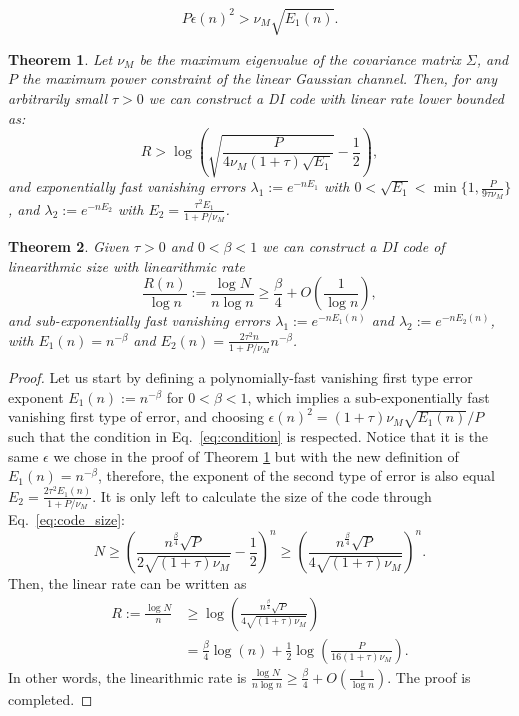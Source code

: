 \documentclass[10pt,a4paper]{amsart}
\newtheorem{theorem}{Theorem}
\begin{document}
\begin{equation}\label{eq:condition}
P\epsilon(n)^2>\nu_M \sqrt{E_1(n)}.
\end{equation}

\begin{theorem}\label{thm:ach_linear}
Let $\nu_M$ be the maximum eigenvalue of the covariance matrix $\Sigma$, and $P$ the maximum power constraint of the linear Gaussian channel. Then, for any arbitrarily small $\tau>0$ we can construct a DI code with linear rate lower bounded as:
\[
R>\log\left(\sqrt{\frac{P}{4\nu_M(1+\tau) \sqrt{E_1}}}-\frac12\right),
\]
and exponentially fast vanishing errors $\lambda_1:=e^{-nE_1}$ with $0<\sqrt{E_1}< \min\{1,\frac{P}{9\tau\nu_M}\}$, and $\lambda_2:=e^{-nE_2}$ with $E_2=\frac{\tau^2E_1}{1+P/\nu_M}$.
\end{theorem}

\begin{theorem}\label{thm:achievability_linearithmic}
Given $\tau>0$ and $0<\beta<1$ we can construct a DI code of linearithmic size with linearithmic rate
\[
\frac{R(n)}{\log n}:=\frac{\log N}{n\log n}\geq\frac{\beta}{4}+O\left(\frac{1}{\log n}\right),
\]
and sub-exponentially fast vanishing errors $\lambda_1:=e^{-nE_1(n)}$ and $\lambda_2:=e^{-nE_2(n)}$, with $E_1(n)=n^{-\beta}$ and $E_2(n)=\frac{2\tau^2n}{1+P/\nu_M}n^{-\beta}$.
\end{theorem}

\begin{proof}
Let us start by defining a polynomially-fast vanishing first type error exponent $E_1(n):=n^{-\beta}$ for $0<\beta<1$, which implies a sub-exponentially fast vanishing first type of error, and choosing $\epsilon(n)^2=(1+\tau)\nu_M\sqrt{E_1(n)}/P$ such that the condition in Eq.~\eqref{eq:condition} is respected. Notice that it is the same $\epsilon$ we chose in the proof of Theorem \ref{thm:ach_linear} but with the new definition of $E_1(n)=n^{-\beta}$, therefore, the exponent of the second type of error is also equal $E_2=\frac{2\tau^2E_1(n)}{1+P/\nu_M}$. It is only left to calculate the size of the code through Eq.~\eqref{eq:code_size}:
\[
N\geq\left(\frac{n^{\frac{\beta}{4}}\sqrt{P}}{2\sqrt{(1+\tau)\nu_M}}-\frac12\right)^n\geq\left(\frac{n^{\frac{\beta}{4}}\sqrt{P}}{4\sqrt{(1+\tau)\nu_M}}\right)^n.
\]
Then, the linear rate can be written as 
\[
\begin{split}
R:=\frac{\log N}{n}&\geq\log\left(\frac{n^{\frac{\beta}{4}}\sqrt{P}}{4\sqrt{(1+\tau)\nu_M}}\right)\\   
&=\frac{\beta}{4}\log(n)+\frac12\log\left(\frac{P}{16(1+\tau)\nu_M}\right).
\end{split}
\]
In other words, the linearithmic rate is $\frac{\log N}{n\log n}\geq\frac{\beta}{4}+O(\frac{1}{\log n})$. The proof is completed.
\end{proof}
\end{document}
